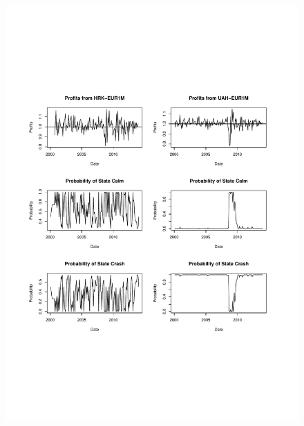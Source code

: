 \documentclass[12pt, a4paper, oneside]{article} %
\begin{document}
\begin{figure}[h!]
\centering
\includegraphics[scale = .80]{../Figures/2RegProb/HRKUAHEUR.pdf}
\end{figure}
\end{document}
